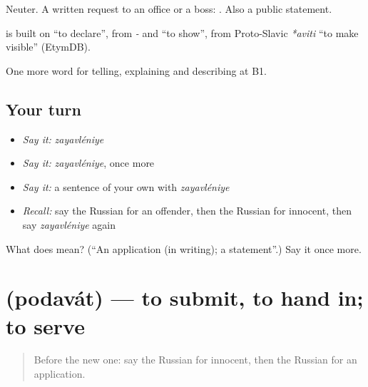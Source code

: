Neuter. A written request to an office or a boss: \emph{  }. Also a public statement.

\begin{cousinweb}
\textbf{} is built on \emph{} \textquotedblleft{}to declare\textquotedblright{}, from \emph{-} and \emph{} \textquotedblleft{}to show\textquotedblright{}, from Proto-Slavic \emph{*aviti} \textquotedblleft{}to make visible\textquotedblright{} (EtymDB).
\end{cousinweb}

\begin{grammarlens}[title={What you've built}]
One more word for telling, explaining and describing at B1.
\end{grammarlens}

\subsection*{Your turn}
\begin{itemize}
\raggedright
  \item \emph{Say it:} \emph{zayavléniye}
  \item \emph{Say it:} \emph{zayavléniye}, once more
  \item \emph{Say it:} a sentence of your own with \emph{zayavléniye}
  \item \emph{Recall:} say the Russian for an offender, then the Russian for innocent, then say \emph{zayavléniye} again
\end{itemize}

\begin{tcolorbox}[breakable,colback=teal!4,colframe=teal!35!black,title={Before you move on}]
What does  mean? (\textquotedblleft{}An application (in writing); a statement\textquotedblright{}.) Say it once more.
\end{tcolorbox}
\section[\texorpdfstring{\ru{подавать} (podavát)}{подавать (podavát)}]{ (podavát) — to submit, to hand in; to serve}

\label{lesson:RU-C393-podavat}



\begin{quote}
Before the new one: say the Russian for innocent, then the Russian for an application.
\end{quote}


